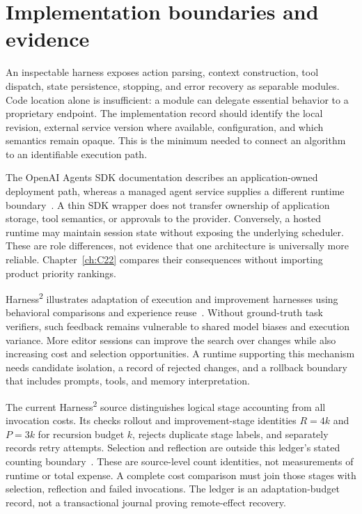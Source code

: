 \section{Implementation boundaries and evidence}\label{sec:C20:implementation}
An inspectable harness exposes action parsing, context construction, tool dispatch, state persistence, stopping, and error recovery as separable modules. Code location alone is insufficient: a module can delegate essential behavior to a proprietary endpoint. The implementation record should identify the local revision, external service version where available, configuration, and which semantics remain opaque. This is the minimum needed to connect an algorithm to an identifiable execution path.

The OpenAI Agents SDK documentation describes an application-owned deployment path, whereas a managed agent service supplies a different runtime boundary~\cite{openai2026agents}. A thin SDK wrapper does not transfer ownership of application storage, tool semantics, or approvals to the provider. Conversely, a hosted runtime may maintain session state without exposing the underlying scheduler. These are role differences, not evidence that one architecture is universally more reliable. Chapter~\ref{ch:C22} compares their consequences without importing product priority rankings.

Harness\textsuperscript{2} illustrates adaptation of execution and improvement harnesses using behavioral comparisons and experience reuse~\cite{corpus261014224}. Without ground-truth task verifiers, such feedback remains vulnerable to shared model biases and execution variance. More editor sessions can improve the search over changes while also increasing cost and selection opportunities. A runtime supporting this mechanism needs candidate isolation, a record of rejected changes, and a rollback boundary that includes prompts, tools, and memory interpretation.

The current Harness\textsuperscript{2} source distinguishes logical stage accounting from all invocation costs. Its  checks rollout and improvement-stage identities $R=4k$ and $P=3k$ for recursion budget $k$, rejects duplicate stage labels, and separately records retry attempts. Selection and reflection are outside this ledger's stated counting boundary~\cite{cumb2026harness2code}. These are source-level count identities, not measurements of runtime or total expense. A complete cost comparison must join those stages with selection, reflection and failed invocations. The ledger is an adaptation-budget record, not a transactional journal proving remote-effect recovery.

